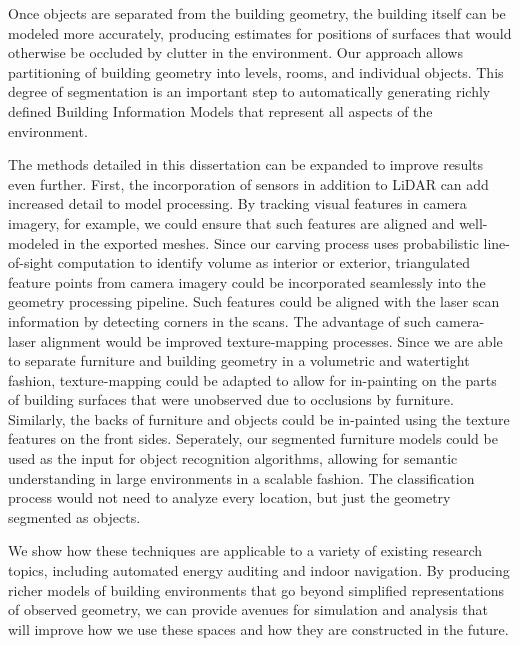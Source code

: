 \documentclass[12pt,onecolumn,oneside]{book}
\begin{document}
Once objects are separated from the building geometry, the building itself can be modeled more accurately, producing estimates for positions of surfaces that would otherwise be occluded by clutter in the environment.  Our approach allows partitioning of building geometry into levels, rooms, and individual objects.  This degree of segmentation is an important step to automatically generating richly defined Building Information Models that represent all aspects of the environment. 

The methods detailed in this dissertation can be expanded to improve results even further.  First, the incorporation of sensors in addition to LiDAR can add increased detail to model processing.  By tracking visual features in camera imagery, for example, we could ensure that such features are aligned and well-modeled in the exported meshes.  Since our carving process uses probabilistic line-of-sight computation to identify volume as interior or exterior, triangulated feature points from camera imagery could be incorporated seamlessly into the geometry processing pipeline.  Such features could be aligned with the laser scan information by detecting corners in the scans.  The advantage of such camera-laser alignment would be improved texture-mapping processes.  Since we are able to separate furniture and building geometry in a volumetric and watertight fashion, texture-mapping could be adapted to allow for in-painting on the parts of building surfaces that were unobserved due to occlusions by furniture.  Similarly, the backs of furniture and objects could be in-painted using the texture features on the front sides.  Seperately, our segmented furniture models could be used as the input for object recognition algorithms, allowing for semantic understanding in large environments in a scalable fashion.  The classification process would not need to analyze every location, but just the geometry segmented as objects.

We show how these techniques are applicable to a variety of existing research topics, including automated energy auditing and indoor navigation.  By producing richer models of building environments that go beyond simplified representations of observed geometry, we can provide avenues for simulation and analysis that will improve how we use these spaces and how they are constructed in the future.


%

\vfill

\end{document}
